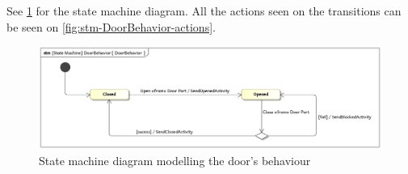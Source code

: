 \documentclass[a4paper]{article}
\begin{document}
See \cref{fig:stm-DoorBehavior} for the state machine diagram. All the actions
seen on the transitions can be seen on \cref{fig:stm-DoorBehavior-actions}.

\begin{figure}
	\includegraphics[width=\textwidth]{stm-DoorBehavior.jpg}
	\caption{State machine diagram modelling the door's behaviour}%
	\label{fig:stm-DoorBehavior}
\end{figure}
\end{document}
